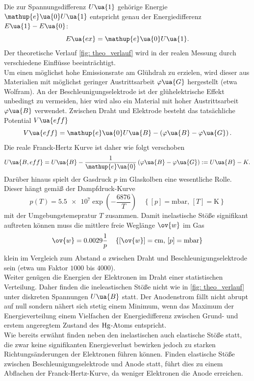 Die zur Spannungsdifferenz $U\ua{1}$ gehörige
Energie $\mathup{e}\ua{0}U\ua{1}$ entspricht genau der Energiedifferenz $E\ua{1} - E\ua{0}$:
\begin{equation}
  \label{eq: anregungsenergie}
  E\ua{ex} = \mathup{e}\ua{0}U\ua{1}.
\end{equation}
Der theoretische
Verlauf \ref{fig: theo_verlauf} wird in der realen Messung durch verschiedene Einflüsse beeinträchtigt. \\
Um einen möglichst hohe Emissionsrate am Glühdrah zu erzielen, wird dieser aus Materialien mit möglichst geringer Austrittsarbeit $\varphi\ua{G}$ %
hergestellt (etwa Wolfram). An der Beschleunigungselektrode ist der glühelektrische Effekt unbedingt zu vermeiden, hier wird also
ein Material mit hoher Austrittsarbeit $\varphi\ua{B}$ verwendet. Zwischen Draht und Elektrode besteht das tatsächliche
Potential $V\ua{eff}$
\begin{equation}
  V\ua{eff} = \mathup{e}\ua{0} U\ua{B} - \left(\varphi\ua{B} - \varphi\ua{G}  \right).
\end{equation}
Die reale Franck-Hertz Kurve ist daher wie folgt verschoben
\begin{equation}
  \label{eq: effektivspannung}
  U\ua{B, eff} = U\ua{B} - \frac{1}{\mathup{e}\ua{0}}\left(\varphi\ua{B} - \varphi\ua{G}  \right) := U\ua{B}  - K.
\end{equation}
Darüber hinaus spielt der Gasdruck $p$ im Glaskolben eine wesentliche Rolle. Dieser hängt gemäß der Dampfdruck-Kurve
\begin{equation}
  \label{eq: dampfdruck}
  p(T) = \num{5.5e7}\exp \left( -\frac{6876}{T} \right) \quad \left\{[p] = \si{\milli\bar}, \, [T] = \si{\kelvin}\right\} %
\end{equation}
mit der Umgebungstemepratur $T$ zusammen. Damit inelastische Stöße signifikant auftreten können muss die mittlere
freie Weglänge $\ov{w}$ im Gas
\begin{equation}
  \label{eq: weglaenge}
  \ov{w} = 0.0029 \frac{1}{p} \quad \left\{[\ov{w}] = \si{\centi\meter}, \, [p] = \si{\milli\bar} \right\}
\end{equation}
klein im Vergleich zum Abstand $a$ zwischen Draht und Beschleunigungselektrode sein (etwa um Faktor $1000$ bis $4000$). \\
Weiter genügen die Energien der Elektronen im Draht einer statistischen Verteilung. Daher finden die ineleastischen
Stöße nicht wie in \ref{fig: theo_verlauf} unter diskreten Spannungen $U\ua{B}$ statt. Der Anodenstrom fällt nicht abrupt
auf null sondern nähert sich stetig einem Minimum, wenn das Maximum der Energieverteilung einem Vielfachen der Energiedifferenz
zwischen Grund- und erstem angeregtem Zustand des $\ce{Hg}$-Atoms entspricht. \\
Wie bereits erwähnt finden neben den inelastischen auch elastische Stöße statt, die zwar keine signifikanten Energieverlust
bewirken jedoch zu starken Richtungsänderungen der Elektronen führen können. Finden elastische Stöße zwischen Beschleunigungselektrode
und Anode statt, führt dies zu einem Abflachen der Franck-Hertz-Kurve, da weniger Elektronen die Anode erreichen.
